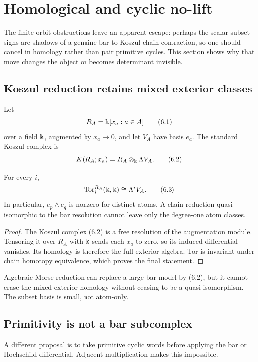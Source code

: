 \section{Homological and cyclic no-lift}
\label{sec:homological}

The finite orbit obstructions leave an apparent escape: perhaps the scalar
subset signs are shadows of a genuine bar-to-Koszul chain contraction, so
one should cancel in homology rather than pair primitive cycles.  This
section shows why that move changes the object or becomes determinant
invisible.

\subsection{Koszul reduction retains mixed exterior classes}

Let
\[
  R_A=\Bbbk[x_a:a\in A]
  \tag{6.1}
\]
over a field $\Bbbk$, augmented by $x_a\mapsto0$, and let $V_A$ have basis
$e_a$.  The standard Koszul complex is
\[
  K(R_A;x_a)=R_A\otimes_\Bbbk\Lambda V_A.
  \tag{6.2}
\]

\begin{theorem}
\label{thm:tor}
For every $i$,
\[
  \operatorname{Tor}^{R_A}_i(\Bbbk,\Bbbk)\cong\Lambda^i V_A.
  \tag{6.3}
\]
In particular, $e_p\wedge e_q$ is nonzero for distinct atoms.  A chain
reduction quasi-isomorphic to the bar resolution cannot leave only the
degree-one atom classes.
\end{theorem}

\begin{proof}
The Koszul complex (6.2) is a free resolution of the augmentation module.
Tensoring it over $R_A$ with $\Bbbk$ sends each $x_a$ to zero, so its induced
differential vanishes.  Its homology is therefore the full exterior algebra.
Tor is invariant under chain homotopy equivalence, which proves the final
statement.
\end{proof}

Algebraic Morse reduction can replace a large bar model by (6.2), but it
cannot erase the mixed exterior homology without ceasing to be a
quasi-isomorphism.  The subset basis is small, not atom-only.

\subsection{Primitivity is not a bar subcomplex}

A different proposal is to take primitive cyclic words before applying the
bar or Hochschild differential.  Adjacent multiplication makes this
impossible.

